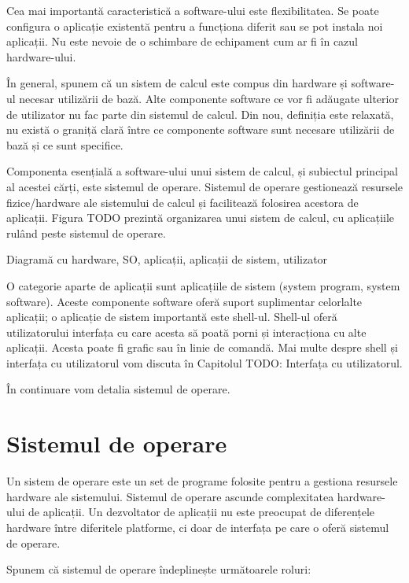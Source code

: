 Cea mai importantă caracteristică a software-ului este flexibilitatea. Se poate configura o aplicație existentă pentru a funcționa diferit sau se pot instala noi aplicații. Nu este nevoie de o schimbare de echipament cum ar fi în cazul hardware-ului.

În general, spunem că un sistem de calcul este compus din hardware și software-ul necesar utilizării de bază. Alte componente software ce vor fi adăugate ulterior de utilizator nu fac parte din sistemul de calcul. Din nou, definiția este relaxată, nu există o graniță clară între ce componente software sunt necesare utilizării de bază și ce sunt specifice.

Componenta esențială a software-ului unui sistem de calcul, și subiectul principal al acestei cărți, este sistemul de operare. Sistemul de operare gestionează resursele fizice/hardware ale sistemului de calcul și facilitează folosirea acestora de aplicații. Figura TODO prezintă organizarea unui sistem de calcul, cu aplicațiile rulând peste sistemul de operare.

Diagramă cu hardware, SO, aplicații, aplicații de sistem, utilizator

O categorie aparte de aplicații sunt aplicațiile de sistem (system program, system software). Aceste componente software oferă suport suplimentar celorlalte aplicații; o aplicație de sistem importantă este shell-ul. Shell-ul oferă utilizatorului interfața cu care acesta să poată porni și interacționa cu alte aplicații. Acesta poate fi grafic sau în linie de comandă. Mai multe despre shell și interfața cu utilizatorul vom discuta în Capitolul TODO: Interfața cu utilizatorul.

În continuare vom detalia sistemul de operare.

\section{Sistemul de operare}
\label{sec:intro:os}

Un sistem de operare este un set de programe folosite pentru a gestiona resursele hardware ale sistemului. Sistemul de operare ascunde complexitatea hardware-ului de aplicații. Un dezvoltator de aplicații nu este preocupat de diferențele hardware între diferitele platforme, ci doar de interfața pe care o oferă sistemul de operare.

Spunem că sistemul de operare îndeplinește următoarele roluri:

